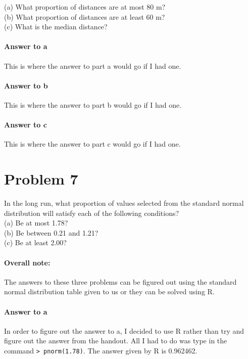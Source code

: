 \documentclass{article}
\begin{document}
	\noindent (a) What proportion of distances are at most 80 m?  \\
	(b) What proportion of distances are at least 60 m? \\
	(c) What is the median distance?
	
	\paragraph{Answer to a}
	This is where the answer to part a would go if I had one.
	
	\paragraph{Answer to b}
	This is where the answer to part b would go if I had one.
	
	\paragraph{Answer to c}
	This is where the answer to part c would go if I had one.
	
\fi

\clearpage
\section*{Problem 7}

	In the long run, what proportion of values selected from the standard normal distribution will 
	satisfy each of the following conditions? \\
	
	\noindent (a) Be at most 1.78? \\
	(b) Be between 0.21 and 1.21? \\
	(c) Be at least 2.00? 
	
	\paragraph{Overall note:}
	The answers to these three problems can be figured out using the standard normal distribution 
	table given to us or they can be solved using R.
	
	\paragraph{Answer to a}
	In order to figure out the answer to a, I decided to use R rather than try and figure out the 
	answer from the handout. All I had to do was type in the command \texttt{> pnorm(1.78)}. The 
	answer given by R is 0.962462.
	
\end{document}
